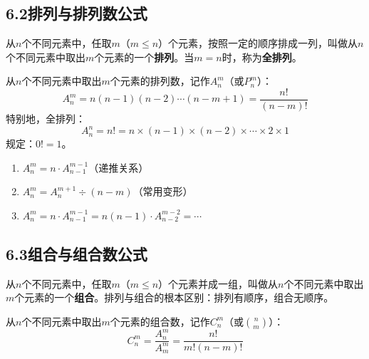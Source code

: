 \documentclass[12pt, a4paper]{ctexart}
\begin{document}
\subsection*{6.2\quad 排列与排列数公式}

\begin{knowledgebox}[排列的定义]
从$n$个不同元素中，任取$m$（$m \leqslant n$）个元素，按照一定的顺序排成一列，叫做从$n$个不同元素中取出$m$个元素的一个\textbf{排列}。当$m = n$时，称为\textbf{全排列}。
\end{knowledgebox}

\begin{knowledgebox}[排列数公式]
从$n$个不同元素中取出$m$个元素的排列数，记作$A_n^m$（或$P_n^m$）：
\[
A_n^m = n(n-1)(n-2)\cdots(n-m+1) = \frac{n!}{(n-m)!}
\]
特别地，全排列：
\[
A_n^n = n! = n \times (n-1) \times (n-2) \times \cdots \times 2 \times 1
\]
规定：$0! = 1$。
\end{knowledgebox}

\begin{tipbox}[排列数的性质]
\begin{enumerate}[label=\arabic*.]
  \item $A_n^m = n \cdot A_{n-1}^{m-1}$（递推关系）
  \item $A_n^m = A_n^{m+1} \div (n - m)$（常用变形）
  \item $A_n^m = n \cdot A_{n-1}^{m-1} = n(n-1) \cdot A_{n-2}^{m-2} = \cdots$
\end{enumerate}
\end{tipbox}

\subsection*{6.3\quad 组合与组合数公式}

\begin{knowledgebox}[组合的定义]
从$n$个不同元素中，任取$m$（$m \leqslant n$）个元素并成一组，叫做从$n$个不同元素中取出$m$个元素的一个\textbf{组合}。排列与组合的根本区别：排列有顺序，组合无顺序。
\end{knowledgebox}

\begin{knowledgebox}[组合数公式]
从$n$个不同元素中取出$m$个元素的组合数，记作$C_n^m$（或$\binom{n}{m}$）：
\[
C_n^m = \frac{A_n^m}{A_m^m} = \frac{n!}{m!(n-m)!}
\]
\end{knowledgebox}
\end{document}
